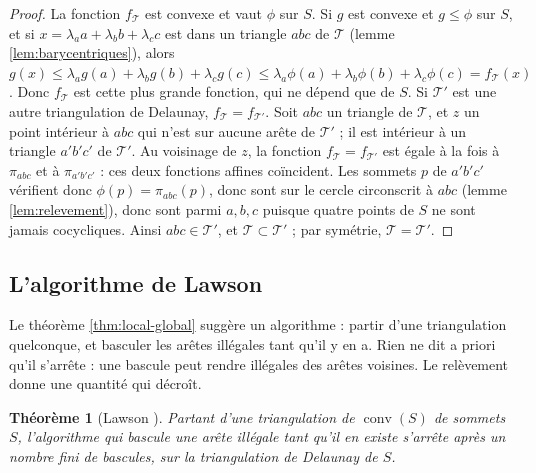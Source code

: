 \documentclass[11pt,a4paper]{article}
\theoremstyle{plain}
\newtheorem{theoreme}{Théorème}[section]
\theoremstyle{definition}
\theoremstyle{remark}
\DeclareMathOperator{\conv}{conv}
\begin{document}
\begin{proof}
La fonction $f_{\mathcal T}$ est convexe et vaut $\phi$ sur $S$. Si $g$ est convexe et $g\leq\phi$ sur $S$, et si $x=\lambda_aa+\lambda_bb+\lambda_cc$ est dans un triangle $abc$ de $\mathcal T$ (lemme \ref{lem:barycentriques}), alors $g(x)\leq\lambda_ag(a)+\lambda_bg(b)+\lambda_cg(c)\leq\lambda_a\phi(a)+\lambda_b\phi(b)+\lambda_c\phi(c)=f_{\mathcal T}(x)$. Donc $f_{\mathcal T}$ est cette plus grande fonction, qui ne dépend que de $S$. Si $\mathcal T'$ est une autre triangulation de Delaunay, $f_{\mathcal T}=f_{\mathcal T'}$. Soit $abc$ un triangle de $\mathcal T$, et $z$ un point intérieur à $abc$ qui n'est sur aucune arête de $\mathcal T'$ ; il est intérieur à un triangle $a'b'c'$ de $\mathcal T'$. Au voisinage de $z$, la fonction $f_{\mathcal T}=f_{\mathcal T'}$ est égale à la fois à $\pi_{abc}$ et à $\pi_{a'b'c'}$ : ces deux fonctions affines coïncident. Les sommets $p$ de $a'b'c'$ vérifient donc $\phi(p)=\pi_{abc}(p)$, donc sont sur le cercle circonscrit à $abc$ (lemme \ref{lem:relevement}), donc sont parmi $a,b,c$ puisque quatre points de $S$ ne sont jamais cocycliques. Ainsi $abc\in\mathcal T'$, et $\mathcal T\subset\mathcal T'$ ; par symétrie, $\mathcal T=\mathcal T'$.
\end{proof}

\subsection{L'algorithme de Lawson}

Le théorème \ref{thm:local-global} suggère un algorithme : partir d'une triangulation quelconque, et basculer les arêtes illégales tant qu'il y en a. Rien ne dit a priori qu'il s'arrête : une bascule peut rendre illégales des arêtes voisines. Le relèvement donne une quantité qui décroît.

\begin{theoreme}[Lawson \cite{lawson}]\label{thm:lawson}
Partant d'une triangulation de $\conv(S)$ de sommets $S$, l'algorithme qui bascule une arête illégale tant qu'il en existe s'arrête après un nombre fini de bascules, sur la triangulation de Delaunay de $S$.
\end{theoreme}
\end{document}
